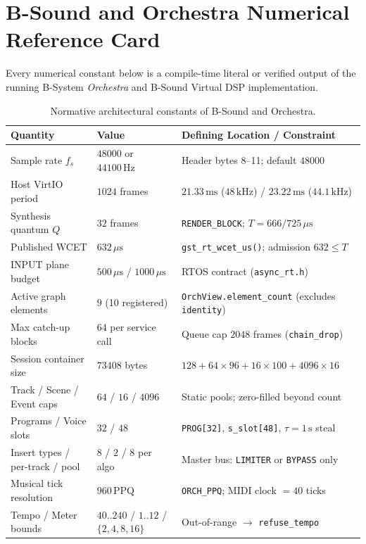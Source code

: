 \chapter{B-Sound and Orchestra Numerical Reference Card}
\label{app:constants}

Every numerical constant below is a compile-time literal or verified output of the running B-System \emph{Orchestra} and B-Sound Virtual DSP implementation.

\begin{table}[htbp]
\centering
\caption{Normative architectural constants of B-Sound and Orchestra.}
\scriptsize
\begin{tabularx}{\textwidth}{@{}llX@{}}
\toprule
Quantity & Value & Defining Location / Constraint \\
\midrule
Sample rate $f_s$ & $48000$ or $44100\,\text{Hz}$ & Header bytes 8--11; default $48000$ \\
Host VirtIO period & $1024$ frames & $21.33\,\text{ms}$ ($48\,\text{kHz}$) / $23.22\,\text{ms}$ ($44.1\,\text{kHz}$) \\
Synthesis quantum $Q$ & $32$ frames & \texttt{RENDER\_BLOCK}; $T = 666 / 725\,\mu\text{s}$ \\
Published WCET & $632\,\mu\text{s}$ & \texttt{gst\_rt\_wcet\_us()}; admission $632 \le T$ \\
INPUT plane budget & $500\,\mu\text{s}$ / $1000\,\mu\text{s}$ & RTOS contract (\texttt{async\_rt.h}) \\
Active graph elements & $9$ (10 registered) & \texttt{OrchView.element\_count} (excludes \texttt{identity}) \\
Max catch-up blocks & $64$ per service call & Queue cap $2048$ frames (\texttt{chain\_drop}) \\
Session container size & $73408$ bytes & $128 + 64\times 96 + 16\times 100 + 4096\times 16$ \\
Track / Scene / Event caps & $64$ / $16$ / $4096$ & Static pools; zero-filled beyond count \\
Programs / Voice slots & $32$ / $48$ & \texttt{PROG[32]}, \texttt{s\_slot[48]}, $\tau = 1\,\text{s}$ steal \\
Insert types / per-track / pool & $8$ / $2$ / $8$ per algo & Master bus: \texttt{LIMITER} or \texttt{BYPASS} only \\
Musical tick resolution & $960\,\mathrm{PPQ}$ & \texttt{ORCH\_PPQ}; MIDI clock $= 40$ ticks \\
Tempo / Meter bounds & $40..240$ / $1..12$ / $\{2,4,8,16\}$ & Out-of-range $\to$ \texttt{refuse\_tempo} \\

\end{tabularx}
\end{table}
